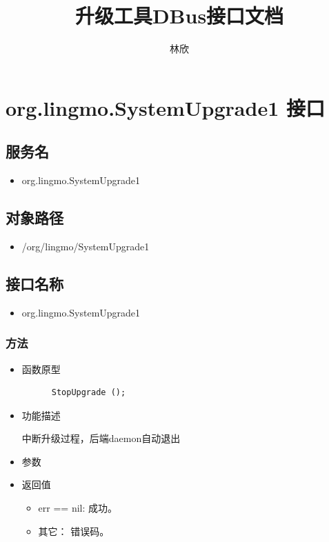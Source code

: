 \documentclass{utart}
\title{升级工具DBus接口文档}
\author{林欣}
\begin{document}

\utMakeTOC

\newpage

\section{org.lingmo.SystemUpgrade1 接口}
\subsection{服务名}
\begin{itemize}
    \item org.lingmo.SystemUpgrade1
\end{itemize}

\subsection{对象路径}
\begin{itemize}
    \item /org/lingmo/SystemUpgrade1
\end{itemize}

\subsection{接口名称}
\begin{itemize}
    \item org.lingmo.SystemUpgrade1
\end{itemize}

\subsubsection{方法}
\begin{itemize}
    \item 函数原型
    
    \begin{verbatim}
      StopUpgrade ();
    \end{verbatim}
    \item 功能描述
  
    中断升级过程，后端daemon自动退出
    \item 参数
    \item 返回值
      \begin{itemize}
          \item err == nil: 成功。
          \item 其它： 错误码。
      \end{itemize}
\end{itemize}
\end{document}
